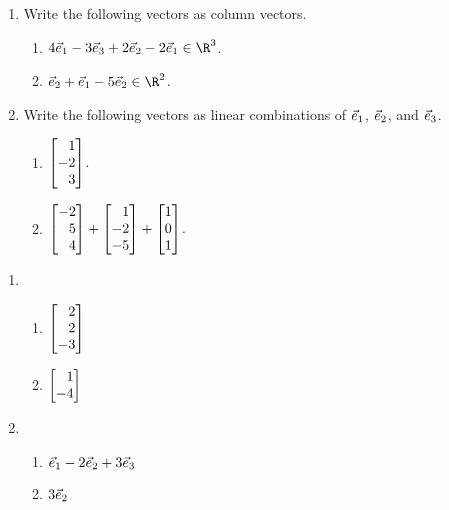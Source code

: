 \begin{exercises}
	\begin{problist}
		\prob
		\begin{enumerate}
			\item
			Write the following vectors as column vectors.
			\begin{enumerate}
				\item $4\xhat -3\zhat +2\yhat -2\xhat\in\R^3$.
				\item $\yhat +\xhat -5\yhat \in\R^2$.
			\end{enumerate}
			\item
			Write the following vectors as linear combinations of
			${\vec e_1}$, ${\vec e_2}$, and ${\vec e_3}$.
			\begin{enumerate}
				\item $\mat{1\\-2\\3}$.
				\item $\mat{-2\\5\\4} + \mat{1\\-2\\ -5} + \mat{1\\0\\1}$.
			\end{enumerate}
		\end{enumerate}
		\begin{solution}
			\begin{enumerate}
				\item
				\begin{enumerate}
					\item $\mat{2\\2\\-3}$
					\item $\mat{1\\-4}$
				\end{enumerate}
				\item
				\begin{enumerate}
					\item ${\vec e_1} - 2{\vec e_2} + 3{\vec e_3}$
					\item $3{\vec e_2}$
				\end{enumerate}
			\end{enumerate}
		\end{solution}


\end{problist}
\end{exercises}
